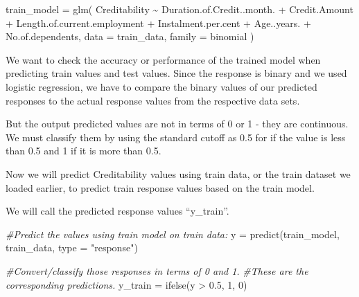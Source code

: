 \documentclass[
]{article}
\newenvironment{Shaded}{\begin{snugshade}}{\end{snugshade}}
\newcommand{\AttributeTok}[1]{\textcolor[rgb]{0.77,0.63,0.00}{#1}}
\newcommand{\CommentTok}[1]{\textcolor[rgb]{0.56,0.35,0.01}{\textit{#1}}}
\newcommand{\DecValTok}[1]{\textcolor[rgb]{0.00,0.00,0.81}{#1}}
\newcommand{\FloatTok}[1]{\textcolor[rgb]{0.00,0.00,0.81}{#1}}
\newcommand{\FunctionTok}[1]{\textcolor[rgb]{0.00,0.00,0.00}{#1}}
\newcommand{\NormalTok}[1]{#1}
\newcommand{\OtherTok}[1]{\textcolor[rgb]{0.56,0.35,0.01}{#1}}
\newcommand{\SpecialCharTok}[1]{\textcolor[rgb]{0.00,0.00,0.00}{#1}}
\newcommand{\StringTok}[1]{\textcolor[rgb]{0.31,0.60,0.02}{#1}}
\begin{document}
\begin{Shaded}
\begin{Highlighting}[]
\NormalTok{train\_model }\OtherTok{=} \FunctionTok{glm}\NormalTok{(}
\NormalTok{                  Creditability }\SpecialCharTok{\textasciitilde{}}\NormalTok{ Duration.of.Credit..month.}
                                \SpecialCharTok{+}\NormalTok{ Credit.Amount}
                                \SpecialCharTok{+}\NormalTok{ Length.of.current.employment}
                                \SpecialCharTok{+}\NormalTok{ Instalment.per.cent}
                                \SpecialCharTok{+}\NormalTok{ Age..years.}
                                \SpecialCharTok{+}\NormalTok{ No.of.dependents, }
                  \AttributeTok{data =}\NormalTok{ train\_data, }
                  \AttributeTok{family =}\NormalTok{ binomial}
\NormalTok{                 )}
\end{Highlighting}
\end{Shaded}

We want to check the accuracy or performance of the trained model when
predicting train values and test values. Since the response is binary
and we used logistic regression, we have to compare the binary values of
our predicted responses to the actual response values from the
respective data sets.

But the output predicted values are not in terms of 0 or 1 - they are
continuous. We must classify them by using the standard cutoff as 0.5
for if the value is less than 0.5 and 1 if it is more than 0.5.

Now we will predict Creditability values using train data, or the train
dataset we loaded earlier, to predict train response values based on the
train model.

We will call the predicted response values ``y\_train''.

\begin{Shaded}
\begin{Highlighting}[]
\CommentTok{\#Predict the values using train model on train data:}
\NormalTok{y }\OtherTok{=} \FunctionTok{predict}\NormalTok{(train\_model, train\_data, }\AttributeTok{type =} \StringTok{"response"}\NormalTok{)}

\CommentTok{\#Convert/classify those responses in terms of 0 and 1.}
\CommentTok{\#These are the corresponding predictions.}
\NormalTok{y\_train }\OtherTok{=} \FunctionTok{ifelse}\NormalTok{(y }\SpecialCharTok{\textgreater{}} \FloatTok{0.5}\NormalTok{, }\DecValTok{1}\NormalTok{, }\DecValTok{0}\NormalTok{)}
\end{Highlighting}
\end{Shaded}
\end{document}
